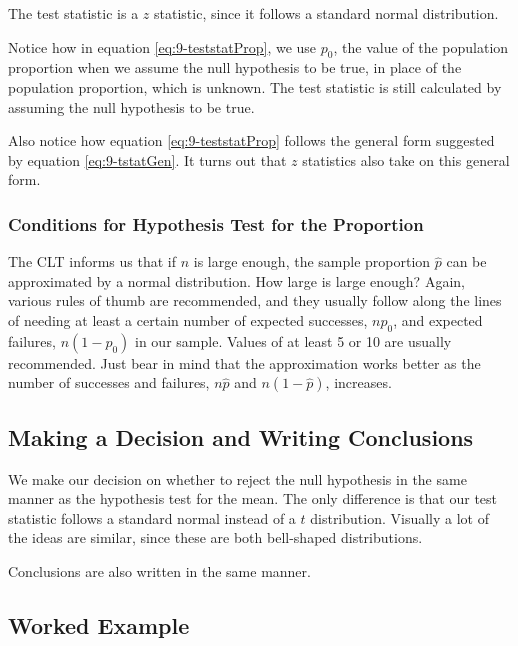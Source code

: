 \documentclass[
]{book}
\begin{document}
The test statistic is a \(z\) statistic, since it follows a standard normal distribution.

Notice how in equation \eqref{eq:9-teststatProp}, we use \(p_0\), the value of the population proportion when we assume the null hypothesis to be true, in place of the population proportion, which is unknown. The test statistic is still calculated by assuming the null hypothesis to be true.

Also notice how equation \eqref{eq:9-teststatProp} follows the general form suggested by equation \eqref{eq:9-tstatGen}. It turns out that \(z\) statistics also take on this general form.

\subsubsection{Conditions for Hypothesis Test for the Proportion}\label{conditions-for-hypothesis-test-for-the-proportion}

The CLT informs us that if \(n\) is large enough, the sample proportion \(\hat{p}\) can be approximated by a normal distribution. How large is large enough? Again, various rules of thumb are recommended, and they usually follow along the lines of needing at least a certain number of expected successes, \(n p_0\), and expected failures, \(n(1-p_0)\) in our sample. Values of at least 5 or 10 are usually recommended. Just bear in mind that the approximation works better as the number of successes and failures, \(n\hat{p}\) and \(n(1-\hat{p})\), increases.

\subsection{Making a Decision and Writing Conclusions}\label{making-a-decision-and-writing-conclusions}

We make our decision on whether to reject the null hypothesis in the same manner as the hypothesis test for the mean. The only difference is that our test statistic follows a standard normal instead of a \(t\) distribution. Visually a lot of the ideas are similar, since these are both bell-shaped distributions.

Conclusions are also written in the same manner.

\subsection{Worked Example}\label{worked-example-6}
\end{document}
